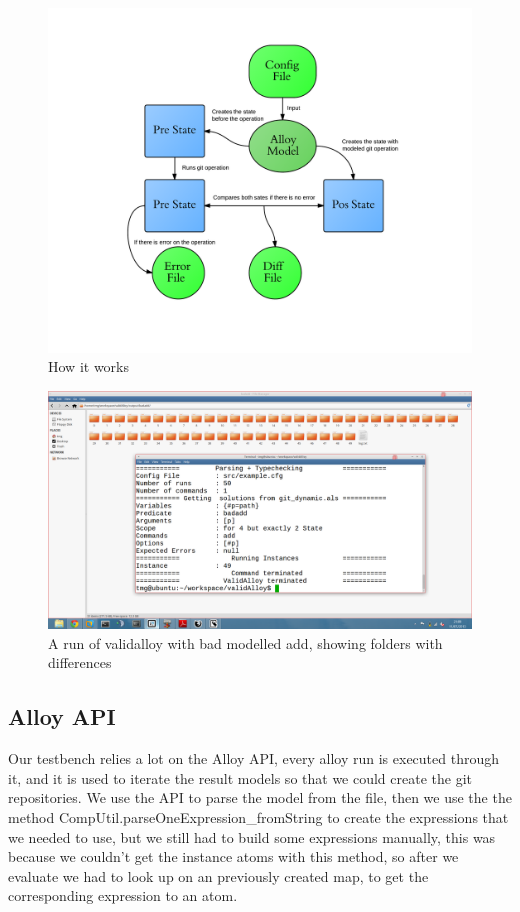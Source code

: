 \begin{figure}[H]
\centering
\includegraphics[width=\textwidth]{images/workflow.png}
\caption{How it works}
\end{figure}

\begin{figure}[H]
\centering
\includegraphics[width=\textwidth]{images/PASTAS.png}
\caption{A run of validalloy with bad modelled add, showing folders with differences}
\end{figure}

\subsection{Alloy API}
Our testbench relies a lot on the Alloy API, every alloy run is executed through it, and it is used to iterate the result models so that we could create the git repositories.
We use the API to parse the model from the file, then we use the the method CompUtil.parseOneExpression\_fromString to create the expressions that we needed to use, but we still had to build some expressions manually, this was because we couldn't get the instance atoms with this method, so after we evaluate we had to look up on an previously created map, to get the corresponding expression to an atom.

